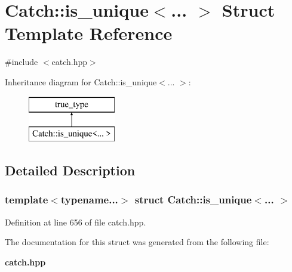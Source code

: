 \section{Catch\+::is\+\_\+unique$<$... $>$ Struct Template Reference}
\label{struct_catch_1_1is__unique}


{\ttfamily \#include $<$catch.\+hpp$>$}

Inheritance diagram for Catch\+::is\+\_\+unique$<$... $>$\+:\begin{figure}[H]
\begin{center}
\leavevmode
\includegraphics[height=2.000000cm]{struct_catch_1_1is__unique}
\end{center}
\end{figure}


\subsection{Detailed Description}
\subsubsection*{template$<$typename...$>$\newline
struct Catch\+::is\+\_\+unique$<$... $>$}



Definition at line 656 of file catch.\+hpp.



The documentation for this struct was generated from the following file\+:\begin{DoxyCompactItemize}
\item 
\textbf{ catch.\+hpp}\end{DoxyCompactItemize}
